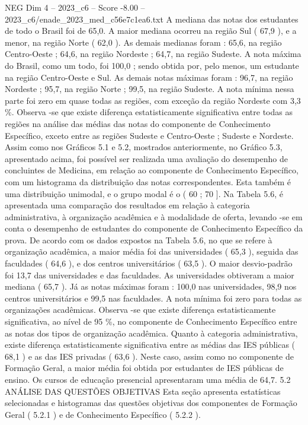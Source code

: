 \begin{textsample}{NEG Dim 4 – 2023\_c6 – Score -8.00 – 2023\_c6/enade\_2023\_med\_c56e7c1ea6.txt}
A mediana das notas dos estudantes de todo o Brasil foi de 65,0.
A maior mediana ocorreu na região Sul ( 67,9 ), e a menor, na região Norte ( 62,0 ).
As demais medianas foram : 65,6, na região Centro-Oeste ; 64,6, na região Nordeste ; 64,7, na região Sudeste.
A nota máxima do Brasil, como um todo, foi 100,0 ; sendo obtida por, pelo menos, um estudante na região Centro-Oeste e Sul.
As demais notas máximas foram : 96,7, na região Nordeste ; 95,7, na região Norte ; 99,5, na região Sudeste.
A nota mínima nessa parte foi zero em quase todas as regiões, com exceção da região Nordeste com 3,3 \%.
Observa -se que existe diferença estatisticamente significativa entre todas as regiões na análise das médias das notas do componente de Conhecimento Específico, exceto entre as regiões Sudeste e Centro-Oeste ; Sudeste e Nordeste.
Assim como nos Gráficos 5.1 e 5.2, mostrados anteriormente, no Gráfico 5.3, apresentado acima, foi possível ser realizada uma avaliação do desempenho de concluintes de Medicina, em relação ao componente de Conhecimento Específico, com um histograma da distribuição das notas correspondentes.
Esta também é uma distribuição unimodal, e o grupo modal é o ( 60 ; 70 ].
Na Tabela 5.6, é apresentada uma comparação dos resultados em relação à categoria administrativa, à organização acadêmica e à modalidade de oferta, levando -se em conta o desempenho de estudantes do componente de Conhecimento Específico da prova.
De acordo com os dados expostos na Tabela 5.6, no que se refere à organização acadêmica, a maior média foi das universidades ( 65,3 ), seguida das faculdades ( 64,6 ), e dos centros universitários ( 63,5 ).
O maior desvio-padrão foi 13,7 das universidades e das faculdades.
As universidades obtiveram a maior mediana ( 65,7 ).
Já as notas máximas foram : 100,0 nas universidades, 98,9 nos centros universitários e 99,5 nas faculdades.
A nota mínima foi zero para todas as organizações acadêmicas.
Observa -se que existe diferença estatisticamente significativa, ao nível de 95 \%, no componente de Conhecimento Específico entre as notas dos tipos de organização acadêmica.
Quanto à categoria administrativa, existe diferença estatisticamente significativa entre as médias das IES públicas ( 68,1 ) e as das IES privadas ( 63,6 ).
Neste caso, assim como no componente de Formação Geral, a maior média foi obtida por estudantes de IES públicas de ensino.
Os cursos de educação presencial apresentaram uma média de 64,7. 5.2 ANÁLISE DAS QUESTÕES OBJETIVAS Esta seção apresenta estatísticas selecionadas e histogramas das questões objetivas dos componentes de Formação Geral ( 5.2.1 ) e de Conhecimento Específico ( 5.2.2 ).

\end{textsample}
